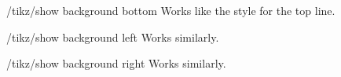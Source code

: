 \begin{stylekey}{/tikz/show background bottom}
    Works like the style for the top line.
\end{stylekey}

\begin{stylekey}{/tikz/show background left}
    Works similarly.
\end{stylekey}

\begin{stylekey}{/tikz/show background right}
    Works similarly.
\end{stylekey}


